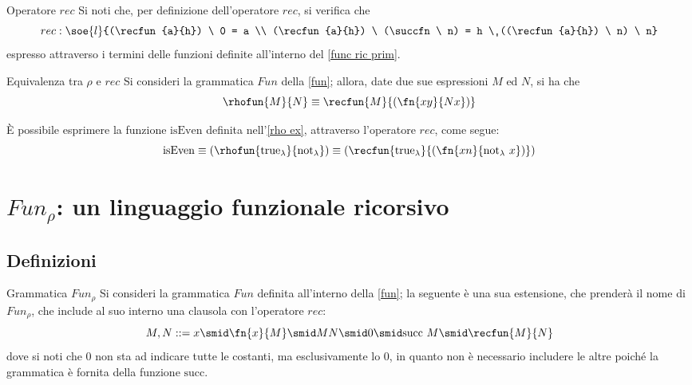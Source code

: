 \documentclass[a4paper, 12pt]{report}
\begin{document}
    \begin{framedobs}[label={rec obs}]{Operatore $rec$}
        Si noti che, per definizione dell'operatore $rec$, si verifica che $$rec: \soe{l}{(\recfun{a}{h}) \ 0 = a \\ (\recfun{a}{h}) \ (\succfn \ n) = h \ ((\recfun{a}{h}) \ n) \ n}$$ espresso attraverso i termini delle funzioni definite all'interno del \cref{func ric prim}.
    \end{framedobs}

    \begin{framedprop}{Equivalenza tra $\rho$ e $rec$}
        Si consideri la grammatica $Fun$ della \cref{fun}; allora, date due sue espressioni $M$ ed $N$, si ha che $$\rhofun{M}{N} \equiv \recfun{M}{(\fn{xy}{Nx})}$$
    \end{framedprop}


    \begin{example}
        È possibile esprimere la funzione $\mathrm{isEven}$ definita nell'\cref{rho ex}, attraverso l'operatore $rec$, come segue: $$\mathrm{isEven} \equiv (\rhofun{\mathrm{true}_\lambda}{\mathrm{not}_\lambda}) \equiv (\recfun{\mathrm{true}_\lambda}{(\fn{xn}{\mathrm{not}_\lambda \ x})})$$
    \end{example}

    \section{$Fun_\rho$: un linguaggio funzionale ricorsivo}

    \subsection{Definizioni}

    \begin{frameddefn}[label={fun rho}]{Grammatica $Fun_\rho$}
        Si consideri la grammatica $Fun$ definita all'interno della \cref{fun}; la seguente è una sua estensione, che prenderà il nome di $Fun_\rho$, che include al suo interno una clausola con l'operatore $rec$: $$M, N ::= x \smid \fn{x}{M} \smid MN \smid 0 \smid \mathrm{succ} \ M \smid \recfun{M}{N}$$ dove si noti che 0 non sta ad indicare tutte le costanti, ma esclusivamente lo 0, in quanto non è necessario includere le altre poiché la grammatica è fornita della funzione $\mathrm{succ}$.
    \end{frameddefn}
\end{document}
